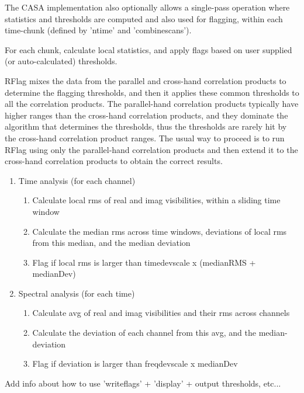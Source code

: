 The CASA implementation also optionally allows a single-pass operation where statistics
and thresholds are computed and also used for flagging, within each time-chunk
(defined by 'ntime' and 'combinescans'). 

For each chunk, calculate local statistics, and apply flags based on user supplied 
(or auto-calculated) thresholds.

RFlag mixes the data from the parallel and cross-hand correlation products to determine 
the flagging thresholds, and then it applies these common thresholds to all the correlation products. 
The parallel-hand correlation products typically have higher ranges than the cross-hand correlation 
products, and they dominate the algorithm that determines the thresholds, thus the thresholds are 
rarely hit by the cross-hand correlation product ranges. The usual way to proceed is to run RFlag 
using only the parallel-hand correlation products and then extend it to the cross-hand correlation 
products to obtain the correct results.

\begin{enumerate}
\item Time analysis (for each channel)
\begin{enumerate}
\item Calculate local rms of real and imag visibilities, within a sliding time window
\item Calculate the median rms across time windows, deviations of local rms from
                              this median, and the median deviation 
\item Flag if local rms is larger than timedevscale x (medianRMS + medianDev)
\end{enumerate}
\item Spectral analysis (for each time)
\begin{enumerate}

\item Calculate avg of real and imag visibilities and their rms across channels
\item Calculate the deviation of each channel from this avg, and the median-deviation
\item Flag if deviation is larger than freqdevscale x medianDev
\end{enumerate}

\end{enumerate}

{\red Add info about how to use 'writeflags' + 'display' + output thresholds, etc...}


